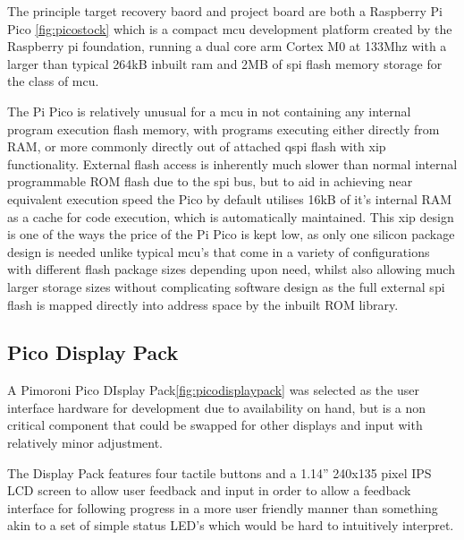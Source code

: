The principle target recovery baord and project board are both a Raspberry Pi Pico \autoref{fig:picostock} which is a compact \gls{mcu} development platform created by the Raspberry pi foundation, running a dual core \gls{arm} Cortex M0 at 133Mhz with a larger than typical 264kB inbuilt \gls{ram} and 2MB of \gls{spi} flash memory storage for the class of \gls{mcu}\cite{ltdBuyRaspberryPi}.

The Pi Pico is relatively unusual for a \gls{mcu} in not containing any internal program execution flash memory, with programs executing either directly from RAM, or more commonly directly out of attached \gls{qspi} flash with \gls{xip} functionality. External flash access is inherently much slower than normal internal programmable ROM flash due to the \gls{spi} bus, but to aid in achieving near equivalent execution speed the Pico by default utilises 16kB of it's internal RAM as a cache for code execution, which is automatically maintained. This \gls{xip} design is one of the ways the price of the Pi Pico is kept low, as only one silicon package design is needed unlike typical \gls{mcu}'s that come in a variety of configurations with different flash package sizes depending upon need, whilst also allowing much larger storage sizes without complicating software design as the full external \gls{spi} flash is mapped directly into address space by the inbuilt ROM library.



\subsection{Pico Display Pack}
A Pimoroni Pico DIsplay Pack\autoref{fig:picodisplaypack} was selected as the user interface hardware for development due to availability on hand, but is a non critical component that could be swapped for other displays and input with relatively minor adjustment.

The Display Pack features four tactile buttons and a 1.14” 240x135 pixel IPS LCD screen to allow user feedback and input in order to allow a feedback interface for following progress in a more user friendly manner than something akin to a set of simple status LED's which would be hard to intuitively interpret.

